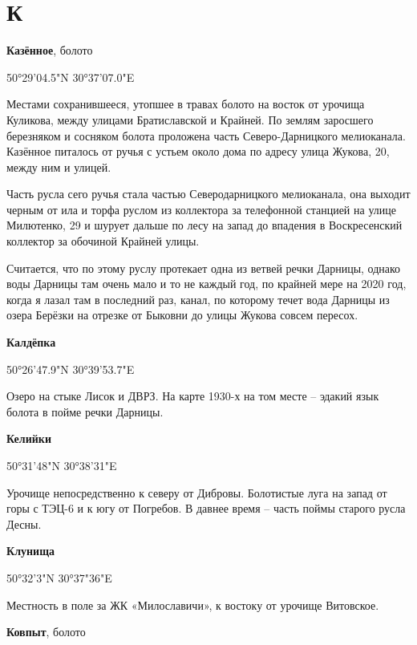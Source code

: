 \chapter*{К}

\textbf{Казённое}, болото

50°29'04.5"N 30°37'07.0"E

Местами сохранившееся, утопшее в травах болото на восток от урочища Куликова, между улицами Братиславской и Крайней. По землям заросшего березняком и сосняком болота проложена часть Северо-Дарницкого мелиоканала. Казённое питалось от ручья с устьем около дома по адресу улица Жукова, 20, между ним и улицей. 

Часть русла сего ручья стала частью Северодарницкого мелиоканала, она выходит черным от ила и торфа руслом из коллектора за телефонной станцией на улице Милютенко, 29 и шурует дальше по лесу на запад до впадения в Воскресенский коллектор за обочиной Крайней улицы.

Считается, что по этому руслу протекает одна из ветвей речки Дарницы, однако воды Дарницы там очень мало и то не каждый год, по крайней мере на 2020 год, когда я лазал там в последний раз, канал, по которому течет вода Дарницы из озера Берёзки на отрезке от Быковни до улицы Жукова совсем пересох.\\

\medskip


\textbf{Калдёпка}

50°26'47.9"N 30°39'53.7"E

Озеро на стыке Лисок и ДВРЗ. На карте 1930-х на том месте – эдакий язык болота в пойме речки Дарницы.\\

\medskip


\textbf{Келийки}

50°31'48"N 30°38'31"E

Урочище непосредственно к северу от Дибровы. Болотистые луга на запад от горы с ТЭЦ-6 и к югу от Погребов. В давнее время – часть поймы старого русла Десны.\\

\medskip


\textbf{Клунища}

50°32'3"N 30°37"36"E

Местность в поле за ЖК «Милославичи», к востоку от урочище Витовское.\\

\medskip


\textbf{Ковпыт}, болото

